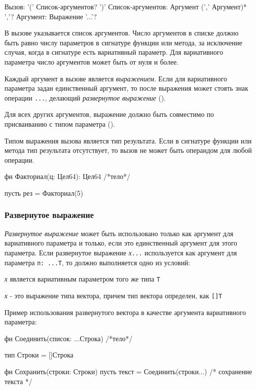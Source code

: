 \begin{Grammar}
Вызов: '(' Список-аргументов? ')'
Список-аргументов: Аргумент (',' Аргумент)* ','?
Аргумент: Выражение '...'?
\end{Grammar}   

В вызове указывается список аргументов. Число аргументов в списке должно быть равно числу параметров в сигнатуре функции или метода, за исключение случая, 
когда в сигнатуре есть вариативный параметр. Для вариативного параметра число аргументов может быть от нуля и более.

Каждый аргумент в вызове является \emph{выражением}. 
Если для вариативного параметра задан единственный аргумент, то после выражения может стоять знак операции \verb+...+, делающий  \emph{развернутое выражение} ().

Для всех других аргументов, выражение должно быть совместимо по присваиванию с типом параметра ().

Типом выражения вызова является тип результата. Если в сигнатуре функции или метода тип результата отсутствует, то вызов не может быть операндом для любой операции.

\begin{Trivil}
фн Факториал(ц: Цел64): Цел64 { /*тело*/ }

пусть рез = Факториал(5)
\end{Trivil}

\hypertarget{call-unfold}{%
\subsubsection{Развернутое выражение}\label{expr:call-unfold}}

\emph{Развернутое выражение} может быть использовано только как аргумент для вариативного параметра и только, если это единственный аргумент для этого параметра. 
Если развернутое выражение \emph{х}\verb+...+ используется как аргумент для параметра \verb+п: ...Т+, то должно выполняется одно из условий:
\begin{d_itemize}
\item
    \emph{х} является вариативным параметром того же типа \verb+Т+
\item
    \emph{х} - это выражение типа вектора, причем тип вектора определен, как \verb+[]Т+
\end{d_itemize}

Пример использования развернутого вектора в качестве аргумента вариативного параметра:
\begin{Trivil}[vspace=2pt]
фн Соединить(список: ...Строка) {/*тело*/}

тип Строки = []Строка

фн Сохранить(строки: Строки) {
   пусть текст = Соединить(строки...)
   /* сохранение текста */
}
\end{Trivil}

